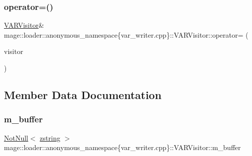 \subsubsection{\texorpdfstring{operator=()}{operator=()}\hspace{0.1cm}{\footnotesize\ttfamily [2/2]}}
{\footnotesize\ttfamily \mbox{\hyperlink{classmage_1_1loader_1_1anonymous__namespace_02var__writer_8cpp_03_1_1_v_a_r_visitor}{V\+A\+R\+Visitor}}\& mage\+::loader\+::anonymous\+\_\+namespace\{var\+\_\+writer.\+cpp\}\+::V\+A\+R\+Visitor\+::operator= (\begin{DoxyParamCaption}\item[{\mbox{\hyperlink{classmage_1_1loader_1_1anonymous__namespace_02var__writer_8cpp_03_1_1_v_a_r_visitor}{V\+A\+R\+Visitor}} \&\&}]{visitor }\end{DoxyParamCaption})\hspace{0.3cm}{\ttfamily [delete]}}



\subsection{Member Data Documentation}
\mbox{\label{classmage_1_1loader_1_1anonymous__namespace_02var__writer_8cpp_03_1_1_v_a_r_visitor_acfd65ace9090295c2f74603a88c2ceab}} 
\subsubsection{\texorpdfstring{m\+\_\+buffer}{m\_buffer}}
{\footnotesize\ttfamily \mbox{\hyperlink{namespacemage_a8769f9d670d6b585ea306cb1062af94b}{Not\+Null}}$<$ \mbox{\hyperlink{namespacemage_a4163ec9a9a27d5e7f4b452dcb99cb2b9}{zstring}} $>$ mage\+::loader\+::anonymous\+\_\+namespace\{var\+\_\+writer.\+cpp\}\+::V\+A\+R\+Visitor\+::m\+\_\+buffer\hspace{0.3cm}{\ttfamily [private]}}


